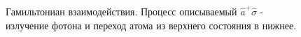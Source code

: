 \begin{figure}
\centering



\caption{Гамильтониан взаимодействия. Процесс описываемый $\hat{a}^{+}\hat{\sigma}$ - излучение
  фотона и переход атома из верхнего состояния в нижнее.}
\label{figPart1Ch2_2_3}
\end{figure}
